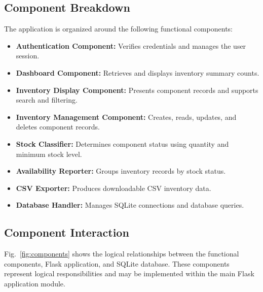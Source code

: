 \documentclass[conference]{IEEEtran}
\begin{document}
\subsection{Component Breakdown}
The application is organized around the following functional components:

\begin{itemize}
\item \textbf{Authentication Component:} Verifies credentials and manages the user session.
\item \textbf{Dashboard Component:} Retrieves and displays inventory summary counts.
\item \textbf{Inventory Display Component:} Presents component records and supports search and filtering.
\item \textbf{Inventory Management Component:} Creates, reads, updates, and deletes component records.
\item \textbf{Stock Classifier:} Determines component status using quantity and minimum stock level.
\item \textbf{Availability Reporter:} Groups inventory records by stock status.
\item \textbf{CSV Exporter:} Produces downloadable CSV inventory data.
\item \textbf{Database Handler:} Manages SQLite connections and database queries.
\end{itemize}

\subsection{Component Interaction}
Fig.~\ref{fig:components} shows the logical relationships between the functional components, Flask application, and SQLite database. These components represent logical responsibilities and may be implemented within the main Flask application module.
\end{document}
